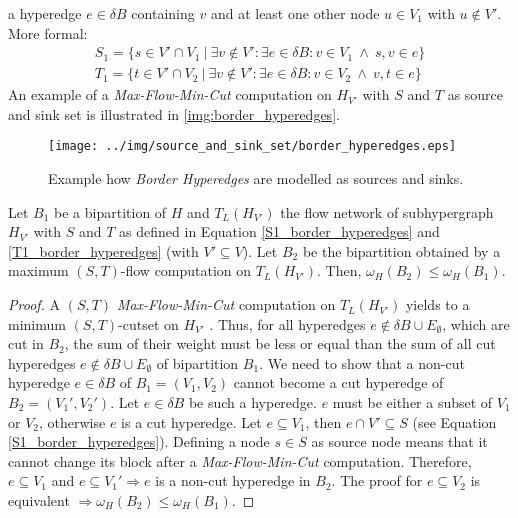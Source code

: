 a hyperedge $e \in \delta B$ containing $v$ and at least one other node $u \in V_1$ with
$u \notin V'$. More formal:
\begin{align}
S_1 = \{ s \in V' \cap V_1\ |\ \exists v \notin V': \exists e \in \delta B: v \in V_1\ \land\ s,v \in e \} \label{S1_border_hyperedges}\\
T_1 = \{ t \in V' \cap V_2\ |\ \exists v \notin V': \exists e \in \delta B: v \in V_2\ \land\ v,t \in e \} \label{T1_border_hyperedges}
\end{align}
An example of a \emph{Max-Flow-Min-Cut} computation on $H_{V'}$ with $S$ and $T$ as source and
sink set is illustrated in \autoref{img:border_hyperedges}.
\begin{figure}
\centering
\texttt{[image: ../img/source\_and\_sink\_set/border\_hyperedges.eps]}
\caption{Example how \emph{Border Hyperedges} are modelled as sources and sinks.}
\label{img:border_hyperedges}
\end{figure}

\begin{lemma}
\label{cut_decrease_proof}
Let $B_1$ be a bipartition of $H$ and $T_L(H_{V'})$ the flow network of subhypergraph
$H_{V'}$ with $S$ and $T$ as defined in Equation \ref{S1_border_hyperedges} and \ref{T1_border_hyperedges} (with $V' \subseteq V$).
Let $B_2$ be the bipartition obtained by a maximum $(S,T)$-flow computation on $T_L(H_{V'})$.
Then, $\omega_H(B_2) \le \omega_H(B_1)$.
\end{lemma}

\begin{proof}
A $(S,T)$ \emph{Max-Flow-Min-Cut} computation on $T_L(H_{V'})$ yields to a minimum $(S,T)$-cutset on 
$H_{V'}$ \cite{ford1956maximal}. Thus, for all hyperedges $e \notin \delta B \cup E_{\emptyset}$, which
are cut in $B_2$, the sum of their weight must be less or equal than the sum of all cut hyperedges
$e \notin \delta B \cup E_{\emptyset}$ of bipartition $B_1$. We need to show that a non-cut
hyperedge $e \in \delta B$ of $B_1 = (V_1,V_2)$ cannot become a cut hyperedge of
$B_2 = (V_1',V_2')$. Let $e \in \delta B$ be such a hyperedge. $e$ must be either a subset of $V_1$ or $V_2$, otherwise
$e$ is a cut hyperedge. Let $e \subseteq V_1$, then $e \cap V' \subseteq S$ (see Equation \ref{S1_border_hyperedges}). 
Defining a node $s \in S$ as source node means that it cannot change its block after a \emph{Max-Flow-Min-Cut}
computation. Therefore, $e \subseteq V_1$ and $e \subseteq V_1' \Rightarrow e$ is a non-cut
hyperedge in $B_2$. The proof for $e \subseteq V_2$ is equivalent $\Rightarrow \omega_H(B_2) 
\le \omega_H(B_1)$.
\end{proof} 

